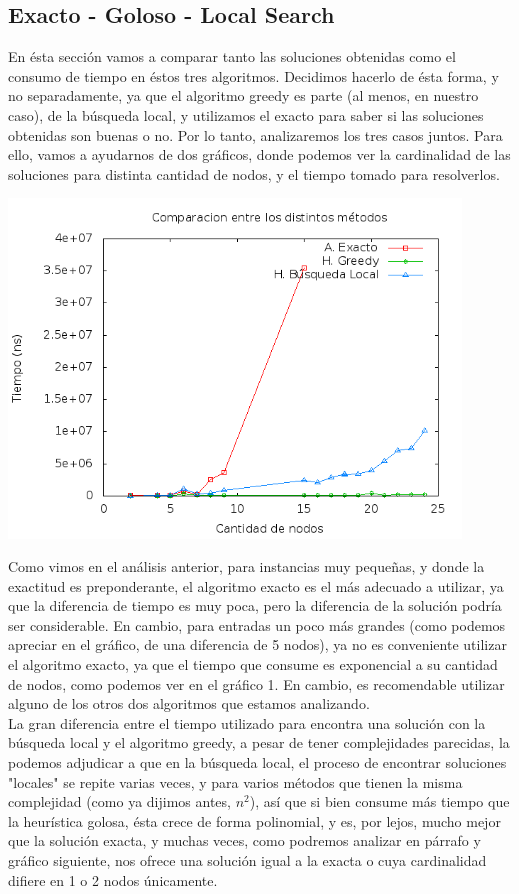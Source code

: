 \subsection{Exacto - Goloso - Local Search}
En ésta sección vamos a comparar tanto las soluciones obtenidas como el consumo de tiempo en éstos tres algoritmos. Decidimos hacerlo de ésta forma, y no separadamente, ya que el algoritmo greedy es parte (al menos, en nuestro caso), de la búsqueda local, y utilizamos el exacto para saber si las soluciones obtenidas son buenas o no. Por lo tanto, analizaremos los tres casos juntos. Para ello, vamos a ayudarnos de dos gráficos, donde podemos ver la cardinalidad de las soluciones para distinta cantidad de nodos, y el tiempo tomado para resolverlos. \\
\begin{center}
  \includegraphics[width=12cm]{./graficos/local_comparacion.png}
\end{center}
Como vimos en el análisis anterior, para instancias muy pequeñas, y donde la exactitud es preponderante, el algoritmo exacto es el más adecuado a utilizar, ya que la diferencia de tiempo es muy poca, pero la diferencia de la solución podría ser considerable. En cambio, para entradas un poco más grandes (como podemos apreciar en el gráfico, de una diferencia de 5 nodos), ya no es conveniente utilizar el algoritmo exacto, ya que el tiempo que consume es exponencial a su cantidad de nodos, como podemos ver en el gráfico 1. En cambio, es recomendable utilizar alguno de los otros dos algoritmos que estamos analizando. \\
La gran diferencia entre el tiempo utilizado para encontra una solución con la búsqueda local y el algoritmo greedy, a pesar de tener complejidades parecidas, la podemos adjudicar a que en la búsqueda local, el proceso de encontrar soluciones "locales" se repite varias veces, y para varios métodos que tienen la misma complejidad (como ya dijimos antes, $n^2$), así que si bien consume más tiempo que la heurística golosa, ésta crece de forma polinomial, y es, por lejos, mucho mejor que la solución exacta, y muchas veces, como podremos analizar en párrafo y gráfico siguiente, nos ofrece una solución igual a la exacta o cuya cardinalidad difiere en 1 o 2 nodos únicamente. \\
